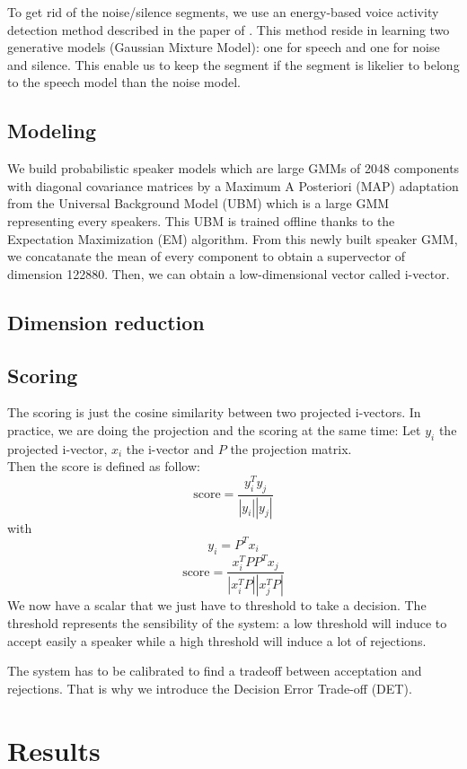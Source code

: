 \documentclass{techrep}
\begin{document}
To get rid of the noise/silence segments, we use an energy-based voice
activity detection method described in the paper of \cite{CRIM}.  This
method reside in learning two generative models (Gaussian Mixture
Model): one for speech and one for noise and silence. This enable us
to keep the segment if the segment is likelier to belong to the speech
model than the noise model.

\subsection{Modeling}

We build probabilistic speaker models which are large GMMs of 2048
components with diagonal covariance matrices by a Maximum A Posteriori
(MAP) adaptation from the Universal Background Model (UBM) which is a
large GMM representing every speakers.  This UBM is trained offline
thanks to the Expectation Maximization (EM) algorithm.  From this
newly built speaker GMM, we concatanate the mean of every component to
obtain a supervector of dimension 122880. Then, we can obtain a
low-dimensional vector called i-vector.

\subsection{Dimension reduction}
\subsection{Scoring}

The scoring is just the cosine similarity between two projected i-vectors.
In practice, we are doing the projection and the scoring at the same time:
Let $y_i$ the projected i-vector, $x_i$ the i-vector and $P$ the projection matrix.\\
Then the score is defined as follow:
$$\text{score} = \frac{y_i^Ty_j}{|y_i||y_j|}$$
with
$$y_i = P^Tx_i$$
$$\text{score} = \frac{x_i^TPP^Tx_j}{|x_i^TP||x_j^TP|}$$ We now have a
scalar that we just have to threshold to take a decision.  The
threshold represents the sensibility of the system: a low threshold
will induce to accept easily a speaker while a high threshold will
induce a lot of rejections.

The system has to be calibrated to find a tradeoff between acceptation
and rejections. That is why we introduce the Decision Error Trade-off
(DET).

\section{Results}
\end{document}
